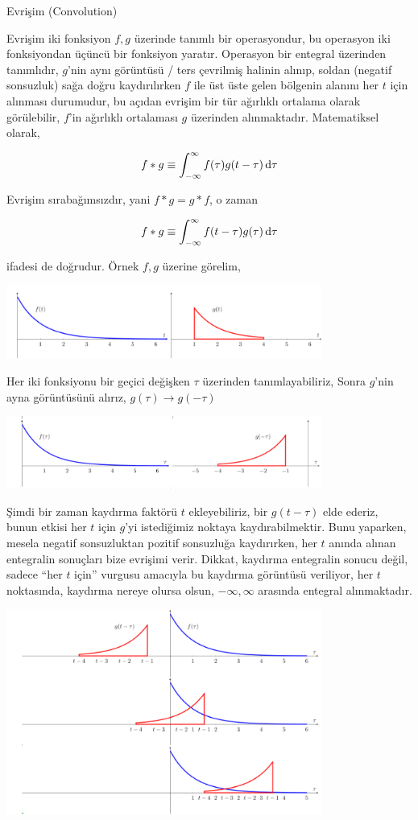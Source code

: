 \documentclass[12pt,fleqn]{article}\usepackage{../../common}
\begin{document}
Evrişim (Convolution)

Evrişim iki fonksiyon $f,g$ üzerinde tanımlı bir operasyondur, bu operasyon
iki fonksiyondan üçüncü bir fonksiyon yaratır. Operasyon bir entegral
üzerinden tanımlıdır, $g$'nin aynı görüntüsü / ters çevrilmiş halinin
alınıp, soldan (negatif sonsuzluk) sağa doğru kaydırılırken $f$ ile üst
üste gelen bölgenin alanını her $t$ için alınması durumudur, bu açıdan
evrişim bir tür ağırlıklı ortalama olarak görülebilir, $f$'in ağırlıklı
ortalaması $g$ üzerinden alınmaktadır. Matematiksel olarak,

$$f * g \equiv \int _{-\infty}^{\infty} f(\tau)g(t-\tau) \,\mathrm{d}\tau $$

Evrişim sırabağımsızdır, yani $f * g = g * f$, o zaman 

$$f * g \equiv \int _{-\infty}^{\infty} f(t-\tau)g(\tau) \,\mathrm{d}\tau $$

ifadesi de doğrudur. Örnek $f,g$ üzerine görelim, 

\includegraphics[width=28em]{tser_conv_01.png}

Her iki fonksiyonu bir geçici değişken $\tau$ üzerinden tanımlayabiliriz,
Sonra $g$'nin ayna görüntüsünü alırız, $g(\tau) \to g(-\tau)$

\includegraphics[width=28em]{tser_conv_02.png}

Şimdi bir zaman kaydırma faktörü $t$ ekleyebiliriz, bir $g(t-\tau)$ elde
ederiz, bunun etkisi her $t$ için $g$'yi istediğimiz noktaya
kaydırabilmektir. Bunu yaparken, mesela negatif sonsuzluktan pozitif
sonsuzluğa kaydırırken, her $t$ anında alınan entegralin sonuçları bize
evrişimi verir. Dikkat, kaydırma entegralin sonucu değil, sadece ``her $t$
için'' vurgusu amacıyla bu kaydırma görüntüsü veriliyor, her $t$
noktasında, kaydırma nereye olursa olsun, $-\infty,\infty$ arasında
entegral alınmaktadır.

\includegraphics[width=28em]{tser_conv_03.png}
\end{document}
